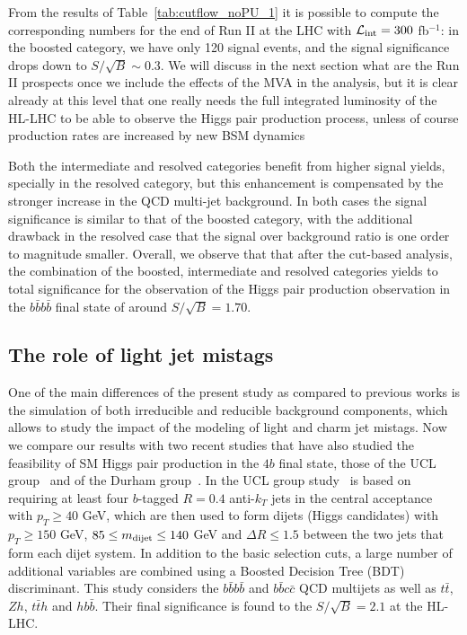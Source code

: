 From the results of Table~\ref{tab:cutflow_noPU_1}
it is possible to compute the corresponding numbers
for the end of Run II at the LHC with
$\mathcal{L}_{\rm int}=300$ fb$^{-1}$: in the boosted category,
we have only
120 signal events, and the signal significance drops down to
$S/\sqrt{B}\sim 0.3$.
%
We will discuss in the next section what are the Run II prospects
once we include the effects of the MVA in the analysis, but
it is clear already at this level that one really needs the full
integrated luminosity of the HL-LHC to be able to observe
the Higgs pair production process, unless  of course production rates are
increased by new BSM dynamics

Both the intermediate and resolved categories benefit from higher signal yields,
specially in the resolved category, but this enhancement is compensated by the stronger
increase in the QCD multi-jet background.
%
In both cases the signal significance is similar to that of the boosted category,
with the additional drawback in the resolved case that the signal over background ratio
is one order to magnitude smaller.
%
Overall, we observe that 
that after the cut-based analysis,
the combination
of the boosted, intermediate and resolved categories yields
to total significance for the observation of the Higgs pair production
observation in the $b\bar{b}b\bar{b}$ final
state of around $S/\sqrt{B}=1.70$.

\subsection{The role of light jet mistags}

One of the main differences of the present study as compared
to previous works is the simulation of both irreducible
and reducible background components, which allows
to study the impact of the modeling of light and charm jet mistags. 
%
Now we compare our results with two recent studies that have also studied the
feasibility of SM Higgs pair production in the $4b$ final state,
those of the UCL group~\cite{Wardrope:2014kya} and of the
Durham group~\cite{deLima:2014dta}.
%
In the UCL group study~\cite{Wardrope:2014kya} is based
on requiring at least four $b$-tagged $R=0.4$ anti-$k_T$ jets
in the central acceptance with $p_T \ge 40$ GeV, which are
then used to form dijets (Higgs candidates) with
$p_T \ge 150$ GeV, $85 \le m_{\rm dijet} \le 140$ GeV
and $\Delta R \le 1.5$ between the two jets that form
each dijet system.
%
In addition to the basic selection cuts, a large number
of additional variables are combined using a
Boosted Decision Tree (BDT) discriminant.
%
This study considers the $b\bar{b}b\bar{b}$ and
$b\bar{b}c\bar{c}$ QCD multijets as well as
$t\bar{t}$, $Zh$, $t\bar{t}h$ and $hb\bar{b}$.
%
Their final significance is found to the $S/\sqrt{B}=2.1$ at the HL-LHC.


